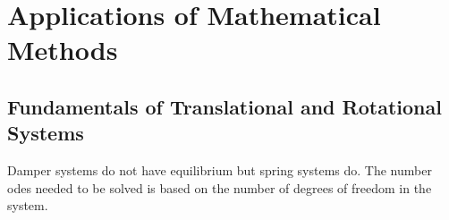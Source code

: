 \chapter{Applications of Mathematical Methods}

\section{Fundamentals of Translational and Rotational Systems}

Damper systems do not have equilibrium but spring systems do.
The number odes needed to be solved is based on the number of degrees of 
freedom in the system.

%
%
%
%
